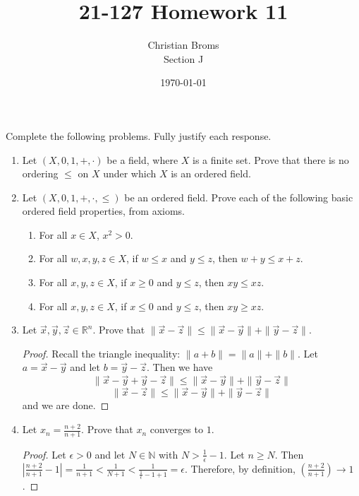 \documentclass[12pt]{article}
\newcommand{\R}{\mathbb{R}}
\newcommand{\N}{\mathbb{N}}
\begin{document}
\title{21-127 Homework 11
}
\author{Christian Broms \\ Section J}
\date{\today}
\maketitle
Complete the following problems. Fully justify each response.


\begin{enumerate}

\item Let $(X, 0, 1, +, \cdot)$ be a field, where $X$ is a finite set. Prove that there is no ordering $\leq$ on $X$ under which $X$ is an ordered field.

\item Let $(X, 0, 1, +, \cdot, \leq)$ be an ordered field. Prove each of the following basic ordered field properties, from axioms.
\begin{enumerate}
\item For all $x\in X$, $x^2>0$.
\item For all $w, x, y, z\in X$, if $w\leq x$ and $y\leq z$, then $w+y\leq x+z$.
\item For all $x, y, z\in X$, if $x\geq 0$ and $y\leq z$, then $xy\leq xz$.
\item For all $x, y, z\in X$, if $x\leq 0$ and $y\leq z$, then $xy\geq xz$.
\end{enumerate}

\item Let $\vec{x}, \vec{y}, \vec{z}\in \R^n$. Prove that $\|\vec{x}-\vec{z}\|\leq \|\vec{x}-\vec{y}\|+\|\vec{y}-\vec{z}\|$.

\begin{proof}
Recall the triangle inequality: $\|a + b\| = \|a\| + \|b\|$. Let $a = \vec{x} - \vec{y}$ and let $b= \vec{y} - \vec{z}$. Then we have $$\|\vec{x}-\vec{y} + \vec{y} - \vec{z}\|\leq \|\vec{x}-\vec{y}\|+\|\vec{y}-\vec{z}\|$$ $$\|\vec{x}-\vec{z}\|\leq \|\vec{x}-\vec{y}\|+\|\vec{y}-\vec{z}\|$$ and we are done.  

\end{proof}

\item Let $x_n = \frac{n+2}{n+1}$. Prove that $x_n$ converges to $1$.

\begin{proof}
Let $\epsilon > 0$ and let $N \in \N$ with $N > \frac{1}{\epsilon} - 1$. Let $n \geq N$. Then $|\frac{n+2}{n+1} - 1| = \frac{1}{n+1} < \frac{1}{N + 1} < \frac{1}{\frac{1}{\epsilon} - 1 + 1} = \epsilon$. Therefore, by definition, $(\frac{n+2}{n+1}) \to 1$.
\end{proof}


\end{enumerate}
\end{document}
